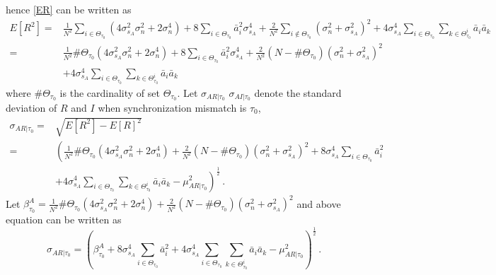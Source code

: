 hence \eqref{ER} can be written as
\begin{equation}
  \begin{split}
	E[R^2] = &\frac{1}{N^2}\sum_{i\in\Theta_{\tau_0}}  (4\sigma_{s_A}^2\sigma_n^2+2\sigma_n^4)+ 8\sum_{i\in\Theta_{\tau_0}}\bar{a}_i^2\sigma_{s_A}^4 + \frac{2}{N^2}\sum_{i\notin\Theta_{\tau_0}}(\sigma_n^2+\sigma_{s_A}^2)^2 + 4\sigma_{s_A}^4\sum_{i\in\Theta_{\tau_0}}\sum_{k\in\Theta_{\tau_0}^i}\bar{a}_i\bar{a}_k\\
	= &\frac{1}{N^2}\#\Theta_{\tau_0}(4\sigma_{s_A}^2\sigma_n^2+2\sigma_n^4) +  8\sum_{i\in\Theta_{\tau_0}}\bar{a}_i^2\sigma_{s_A}^4+ \frac{2}{N^2}(N - \#\Theta_{\tau_0})(\sigma_n^2+\sigma_{s_A}^2)^2\\
    &+4\sigma_{s_A}^4\sum_{i\in\Theta_{\tau_0}}\sum_{k\in\Theta_{\tau_0}^i}\bar{a}_i\bar{a}_k
  \end{split}
  \label{ER2}
\end{equation}
where $\#\Theta_{\tau_0}$ is the cardinality of set $\Theta_{\tau_0}$. 
Let $\sigma_{AR|\tau_0}$ $\sigma_{AI|\tau_0}$ denote the standard deviation of $R$ and $I$ when synchronization mismatch is $\tau_0$, 
\begin{equation}
  \begin{split}
	\sigma_{AR|\tau_0} = &\sqrt{E[R^2] - E[R]^2}\\
	= &\left(\frac{1}{N^2}\#\Theta_{\tau_0}(4\sigma_{s_A}^2\sigma_n^2+2\sigma_n^4) + \frac{2}{N^2}(N - \#\Theta_{\tau_0})(\sigma_n^2+\sigma_{s_A}^2)^2 +  8\sigma_{s_A}^4\sum_{i\in\Theta_{\tau_0}}\bar{a}_i^2 \right.\\
  &\left.+ 4\sigma_{s_A}^4\sum_{i\in\Theta_{\tau_0}}\sum_{k\in\Theta_{\tau_0}^i}\bar{a}_i\bar{a}_k- \mu_{AR|\tau_0}^2\right)^\frac{1}{2}\,.
  \end{split}
  \label{deviationR}
\end{equation}
Let $\beta_{\tau_0}^A = \frac{1}{N^2}\#\Theta_{\tau_0}(4\sigma_{s_A}^2\sigma_n^2+2\sigma_n^4) + \frac{2}{N^2}(N - \#\Theta_{\tau_0})(\sigma_n^2+\sigma_{s_A}^2)^2$ and above equation can be written as
\begin{equation}
  \sigma_{AR|\tau_0} = \left(\beta_{\tau_0}^A+  8\sigma_{s_A}^4\sum_{i\in\Theta_{\tau_0}}\bar{a}_i^2 
    + 4\sigma_{s_A}^4\sum_{i\in\Theta_{\tau_0}}\sum_{k\in\Theta_{\tau_0}^i}\bar{a}_i\bar{a}_k- \mu_{AR|\tau_0}^2\right)^\frac{1}{2}\,.
  \label{devR}
\end{equation}

